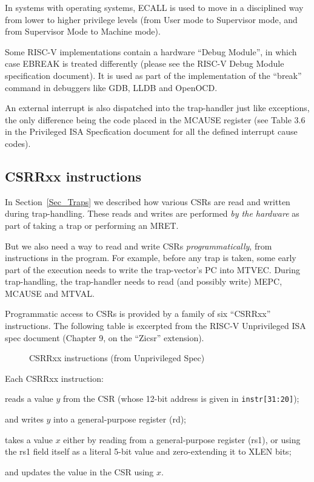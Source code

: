 In systems with operating systems, ECALL is used to move in a
disciplined way from lower to higher privilege levels (from User mode
to Supervisor mode, and from Supervisor Mode to Machine mode).

Some RISC-V implementations contain a hardware ``Debug Module'', in
which case EBREAK is treated differently (please see the RISC-V Debug
Module specification document).  It is used as part of the
implementation of the ``break'' command in debuggers like GDB, LLDB
and OpenOCD.

An external interrupt is also dispatched into the trap-handler just
like exceptions, the only difference being the code placed in the
MCAUSE register (see Table 3.6 in the Privileged ISA Specfication
document for all the defined interrupt cause codes).


\subsection{CSRRxx instructions}

\label{sec_CSRRxx}

In Section~\ref{Sec_Traps} we described how various CSRs are read and
written during trap-handling.  These reads and writes are performed
\emph{by the hardware} as part of taking a trap or performing an MRET.

But we also need a way to read and write CSRs \emph{programmatically},
{\ie} from instructions in the program.  For example, before any trap
is taken, some early part of the execution needs to write the
trap-vector's PC into MTVEC.  During trap-handling, the trap-handler
needs to read (and possibly write) MEPC, MCAUSE and MTVAL.

Programmatic access to CSRs is provided by a family of six ``CSRRxx''
instructions.  The following table is excerpted from the RISC-V
Unprivileged ISA spec document (Chapter 9, on the ``Zicsr''
extension).
\begin{figure}[htbp]
  \centerline{}
  \caption{\label{Fig_CSRRxx_spec} CSRRxx instructions (from Unprivileged Spec)}
\end{figure}
Each CSRRxx instruction:

\begin{tightlist}

 \item reads a value $y$ from the CSR (whose 12-bit address is given in
       \verb|instr[31:20]|);

 \item and writes $y$ into a general-purpose register (rd);

 \item takes a value $x$ either by reading from a general-purpose
       register (rs1), or using the rs1 field itself as a literal
       5-bit value and zero-extending it to XLEN bits;

 \item and updates the value in the CSR using $x$.

\end{tightlist}

